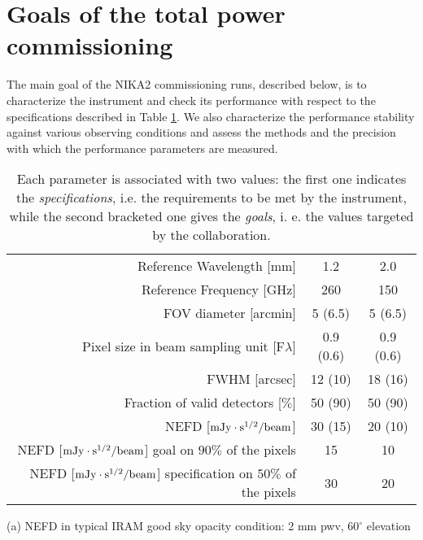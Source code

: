 

\section{Goals of the total power commissioning}
The main goal of the NIKA2 commissioning runs, described below, is to 
characterize the instrument and check its 
performance with respect to the specifications 
described in Table \ref{nika2specs}. 
We also characterize the performance stability 
against various observing conditions and 
assess the methods and the precision with which the performance parameters are measured.


\begin{table}[ht]
\begin{center}
\begin{threeparttable}
\begin{tabular}{|r|c|c|}
  \hline
  \hline
Reference Wavelength  [mm]  &  1.2 & 2.0  \\
Reference Frequency  [GHz]  &  260 & 150  \\
\hline  
\hline
FOV diameter [arcmin]       &  5 (6.5)    &  5 (6.5)   \\
Pixel size in beam sampling unit [F$\lambda$]  &  0.9 (0.6)   &   0.9 (0.6)  \\
FWHM  [arcsec]              &  12 (10)   &  18 (16) \\
Fraction of valid detectors [$\%$] &  50 (90)   &  50 (90) \\
NEFD\tnote{a}\hspace{1mm}   [$\rm{mJy} \cdot \rm{s}^{1/2}/\rm{beam}$]  &  30 (15)   &  20 (10) \\
\hline
NEFD [$\rm{mJy} \cdot \rm{s}^{1/2}/\rm{beam}$] goal on $90\%$ of the pixels  &  15  & 10 \\
NEFD [$\rm{mJy} \cdot \rm{s}^{1/2}/\rm{beam}$] specification on $50\%$ of the pixels  &  30  &  20  \\
\hline
\end{tabular}
\begin{tablenotes}
{\small
  \item[(a)] NEFD in typical IRAM good sky opacity condition: 2 mm pwv, $60^\circ$ elevation
}
\end{tablenotes}
\end{threeparttable}
\caption[Main characteristics defining the expected performances of NIKA2.]{Each parameter is associated with two values: the first one indicates the \emph{specifications}, i.e. the requirements to be met by the instrument, while the second bracketed one gives the \emph{goals}, i. e. the values targeted by the collaboration.}
\label{nika2specs}
\end{center}
\end{table} 


